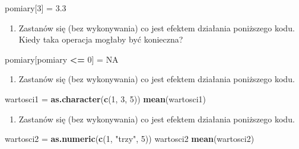 \documentclass[paper=6in:9in,pagesize=pdftex,headinclude=on,footinclude=on,10pt]{scrbook}
\newenvironment{Shaded}{\begin{snugshade}}{\end{snugshade}}
\newcommand{\DecValTok}[1]{\textcolor[rgb]{0.00,0.00,0.81}{#1}}
\newcommand{\FloatTok}[1]{\textcolor[rgb]{0.00,0.00,0.81}{#1}}
\newcommand{\KeywordTok}[1]{\textcolor[rgb]{0.13,0.29,0.53}{\textbf{#1}}}
\newcommand{\NormalTok}[1]{#1}
\newcommand{\OperatorTok}[1]{\textcolor[rgb]{0.81,0.36,0.00}{\textbf{#1}}}
\newcommand{\OtherTok}[1]{\textcolor[rgb]{0.56,0.35,0.01}{#1}}
\newcommand{\StringTok}[1]{\textcolor[rgb]{0.31,0.60,0.02}{#1}}
\providecommand{\tightlist}{%
  \setlength{\itemsep}{0pt}\setlength{\parskip}{0pt}}
\begin{document}
\begin{Shaded}
\begin{Highlighting}[]
\NormalTok{pomiary[}\DecValTok{3}\NormalTok{] =}\StringTok{ }\FloatTok{3.3}
\end{Highlighting}
\end{Shaded}

\begin{enumerate}
\def\labelenumi{\arabic{enumi})}
\setcounter{enumi}{12}
\tightlist
\item
  Zastanów się (bez wykonywania) co jest efektem działania poniższego kodu.
  Kiedy taka operacja mogłaby być konieczna?
\end{enumerate}

\begin{Shaded}
\begin{Highlighting}[]
\NormalTok{pomiary[pomiary }\OperatorTok{<=}\StringTok{ }\DecValTok{0}\NormalTok{] =}\StringTok{ }\OtherTok{NA}
\end{Highlighting}
\end{Shaded}

\begin{enumerate}
\def\labelenumi{\arabic{enumi})}
\setcounter{enumi}{13}
\tightlist
\item
  Zastanów się (bez wykonywania) co jest efektem działania poniższego kodu.
\end{enumerate}

\begin{Shaded}
\begin{Highlighting}[]
\NormalTok{wartosci1 =}\StringTok{ }\KeywordTok{as.character}\NormalTok{(}\KeywordTok{c}\NormalTok{(}\DecValTok{1}\NormalTok{, }\DecValTok{3}\NormalTok{, }\DecValTok{5}\NormalTok{))}
\KeywordTok{mean}\NormalTok{(wartosci1)}
\end{Highlighting}
\end{Shaded}

\begin{enumerate}
\def\labelenumi{\arabic{enumi})}
\setcounter{enumi}{14}
\tightlist
\item
  Zastanów się (bez wykonywania) co jest efektem działania poniższego kodu.
\end{enumerate}

\begin{Shaded}
\begin{Highlighting}[]
\NormalTok{wartosci2 =}\StringTok{ }\KeywordTok{as.numeric}\NormalTok{(}\KeywordTok{c}\NormalTok{(}\DecValTok{1}\NormalTok{, }\StringTok{"trzy"}\NormalTok{, }\DecValTok{5}\NormalTok{))}
\NormalTok{wartosci2}
\KeywordTok{mean}\NormalTok{(wartosci2)}
\end{Highlighting}
\end{Shaded}
\end{document}
